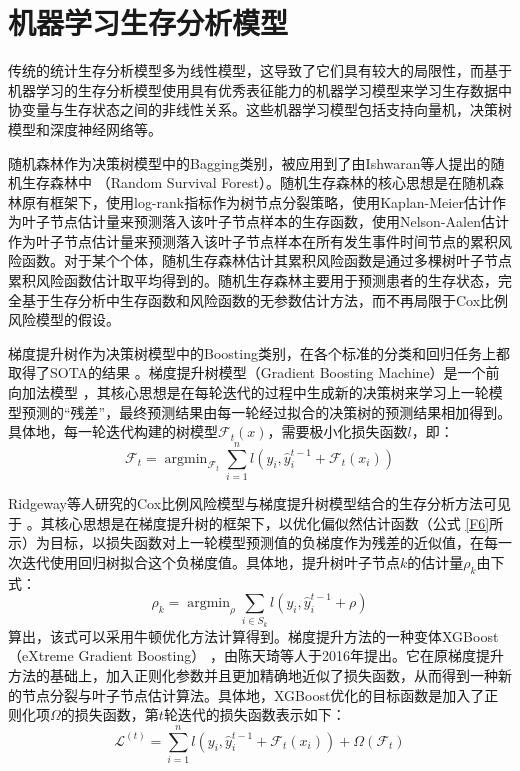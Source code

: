 \section{机器学习生存分析模型}

传统的统计生存分析模型多为线性模型，这导致了它们具有较大的局限性，而基于机器学习的生存分析模型使用具有优秀表征能力的机器学习模型来学习生存数据中协变量与生存状态之间的非线性关系。这些机器学习模型包括支持向量机，决策树模型和深度神经网络等。

随机森林作为决策树模型中的Bagging类别，被应用到了由Ishwaran等人提出的随机生存森林中 （Random Survival Forest）。随机生存森林的核心思想是在随机森林原有框架下，使用log-rank指标作为树节点分裂策略，使用Kaplan-Meier估计作为叶子节点估计量来预测落入该叶子节点样本的生存函数，使用Nelson-Aalen估计作为叶子节点估计量来预测落入该叶子节点样本在所有发生事件时间节点的累积风险函数。对于某个个体，随机生存森林估计其累积风险函数是通过多棵树叶子节点累积风险函数估计取平均得到的。随机生存森林主要用于预测患者的生存状态，完全基于生存分析中生存函数和风险函数的无参数估计方法，而不再局限于Cox比例风险模型的假设。

梯度提升树作为决策树模型中的Boosting类别，在各个标准的分类和回归任务上都取得了SOTA的结果 。梯度提升树模型（Gradient Boosting Machine）是一个前向加法模型 ，其核心思想是在每轮迭代的过程中生成新的决策树来学习上一轮模型预测的“残差”，最终预测结果由每一轮经过拟合的决策树的预测结果相加得到。具体地，每一轮迭代构建的树模型$\mathcal{F}_t (x)$，需要极小化损失函数$l$，即：
\begin{equation}
\mathcal{F}_t = \mathop{\arg\min}_{\mathcal{F}_t} \sum_{i=1}^n l(y_i, \hat{y}_i^{t-1} + \mathcal{F}_t(x_i)) \label{F9}
\end{equation}

Ridgeway等人研究的Cox比例风险模型与梯度提升树模型结合的生存分析方法可见于 。其核心思想是在梯度提升树的框架下，以优化偏似然估计函数（公式 \eqref{F6}所示）为目标，以损失函数对上一轮模型预测值的负梯度作为残差的近似值，在每一次迭代使用回归树拟合这个负梯度值。具体地，提升树叶子节点$k$的估计量$\rho_k$由下式：
\begin{equation}
\rho_k = \mathop{\arg\min}_{\rho} \sum_{i\in S_k} l(y_i, \hat{y}_i^{t-1} + \rho) \label{F10}
\end{equation}算出，该式可以采用牛顿优化方法计算得到。梯度提升方法的一种变体XGBoost（eXtreme Gradient Boosting） ，由陈天琦等人于2016年提出。它在原梯度提升方法的基础上，加入正则化参数并且更加精确地近似了损失函数，从而得到一种新的节点分裂与叶子节点估计算法。具体地，XGBoost优化的目标函数是加入了正则化项$\Omega$的损失函数，第$t$轮迭代的损失函数表示如下： 
\begin{equation}
\mathcal{L}^{(t)} = \sum_{i=1}^n l(y_i, \hat{y}_i^{t-1} + \mathcal{F}_t(x_i)) + \Omega(\mathcal{F}_t) \label{F11}
\end{equation}


